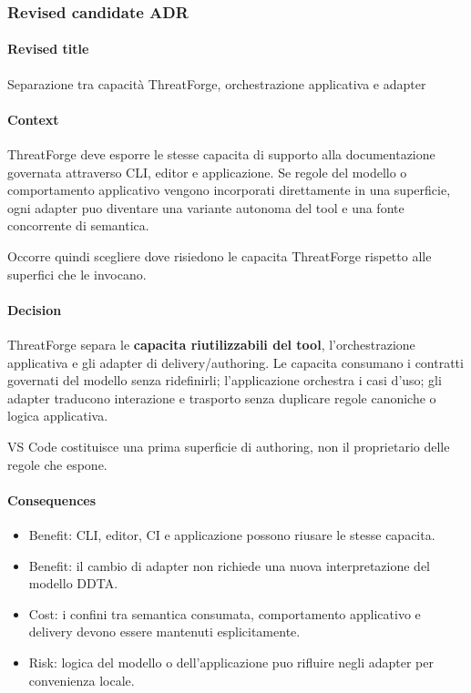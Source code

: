 \documentclass[
  10pt,
]{article}
\providecommand{\tightlist}{%
  \setlength{\itemsep}{0pt}\setlength{\parskip}{0pt}}
\begin{document}
\subsubsection{Revised candidate ADR}\label{revised-candidate-adr-9}

\paragraph{Revised title}\label{revised-title-9}

Separazione tra capacità ThreatForge, orchestrazione applicativa e
adapter

\paragraph{Context}\label{context-19}

ThreatForge deve esporre le stesse capacita di supporto alla
documentazione governata attraverso CLI, editor e applicazione. Se
regole del modello o comportamento applicativo vengono incorporati
direttamente in una superficie, ogni adapter puo diventare una variante
autonoma del tool e una fonte concorrente di semantica.

Occorre quindi scegliere dove risiedono le capacita ThreatForge rispetto
alle superfici che le invocano.

\paragraph{Decision}\label{decision-19}

ThreatForge separa le \textbf{capacita riutilizzabili del tool},
l'orchestrazione applicativa e gli adapter di delivery/authoring. Le
capacita consumano i contratti governati del modello senza ridefinirli;
l'applicazione orchestra i casi d'uso; gli adapter traducono interazione
e trasporto senza duplicare regole canoniche o logica applicativa.

VS Code costituisce una prima superficie di authoring, non il
proprietario delle regole che espone.

\paragraph{Consequences}\label{consequences-19}

\begin{itemize}
\tightlist
\item
  Benefit: CLI, editor, CI e applicazione possono riusare le stesse
  capacita.
\item
  Benefit: il cambio di adapter non richiede una nuova interpretazione
  del modello DDTA.
\item
  Cost: i confini tra semantica consumata, comportamento applicativo e
  delivery devono essere mantenuti esplicitamente.
\item
  Risk: logica del modello o dell'applicazione puo rifluire negli
  adapter per convenienza locale.
\end{itemize}
\end{document}
